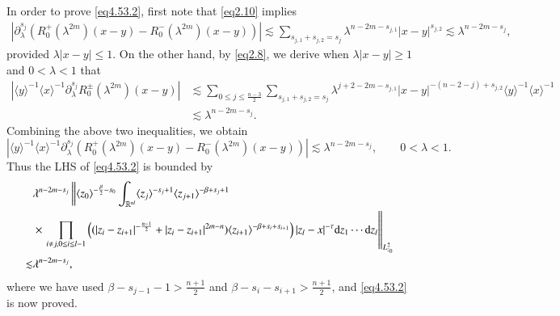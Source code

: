 \documentclass[11pt,reqno]{amsart}
\def\d{{\rm d}}
\numberwithin{equation}{section}
\theoremstyle{definition}
\begin{document}
\begin{appendix}
	In order to prove \eqref{eq4.53.2}, first note that \eqref{eq2.10} implies
	\begin{equation*}
		\begin{aligned}
			\left|\partial_{\lambda}^{s_{j}}\left(R_{0}^{+}(\lambda^{2m})(x-y)-R_{0}^{-}(\lambda^{2m})(x-y)\right)\right| \lesssim\sum_{s_{j,1}+s_{j,2}=s_j}\lambda^{n-2m-s_{j,1}}|x-y|^{s_{j,2}}
			\lesssim\lambda^{n-2m-s_{j}},
		\end{aligned}
	\end{equation*}
	provided  $\lambda|x-y|\le 1$.
	On the other hand, by  \eqref{eq2.8}, we derive  when $\lambda|x-y|\ge 1$ and $0<\lambda<1$ that
	\begin{equation*}
		\begin{aligned}
			\left| \langle y\rangle^{-1}\langle x\rangle^{-1}\partial_{\lambda}^{s_{j}}R_{0}^{\pm}(\lambda^{2m})(x-y)\right| &\lesssim\sum_{0\le j\le{\frac{n-3}{2}}}\sum_{s_{j,1}+s_{j,2}=s_j}{\lambda^{j+2-2m-s_{j,1}}|x-y|^{-(n-2-j)+s_{j,2}} \langle y\rangle^{-1}\langle x\rangle^{-1}}\\
			&\lesssim\lambda^{n-2m-s_{j}}.
		\end{aligned}
	\end{equation*}
	Combining the above two inequalities, we obtain
	\begin{equation*}
		\left| \langle y\rangle^{-1}\langle x\rangle^{-1}\partial_{\lambda}^{s_{j}}\left(R_{0}^{+}(\lambda^{2m})(x-y)-R_{0}^{-}(\lambda^{2m})(x-y)\right)\right|\lesssim\lambda^{n-2m-s_{j}},\qquad 0<\lambda<1.
	\end{equation*}
	Thus the LHS of \eqref{eq4.53.2} is bounded by
	\begin{equation*}
		\begin{aligned}
			&\lambda^{n-2m-s_{j}}\left\|\langle z_0\rangle^{-\frac{\beta}{2}-s_0}\int_{\mathbb{R}^{nl}} \langle z_{j}\rangle^{-s_{j}+1} \langle z_{j+1}\rangle^{-\beta+s_{j}+1}\right. \\
			&\times\left. \prod_{i\ne j, 0\le i\le l-1}\left((|z_{i}-z_{i+1}|^{-\frac{n-1}{2}}+|z_{i}-z_{i+1}|^{2m-n})\langle z_{i+1} \rangle^{-\beta+s_{i}+s_{i+1}} \right)|z_l-x|^{-\tau} \d z_1\cdots \d z_l \right\|_{L_{z_0}^2}\\
			\lesssim&\lambda^{n-2m-s_{j}},
		\end{aligned}
	\end{equation*}
	where we have used $\beta-s_{j-1}-1>\frac{n+1}{2}$ and $\beta-s_i-s_{i+1}> \frac{n+1}{2}$, and \eqref{eq4.53.2} is now proved.	
	

\end{appendix}
\end{document}

